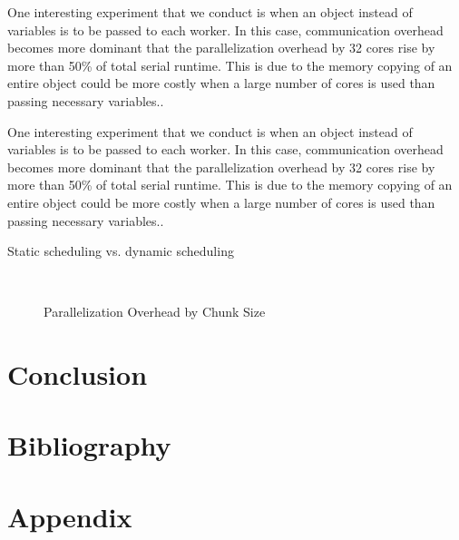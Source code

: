 \documentclass[12pt]{article}
\begin{document}
One interesting experiment that we conduct is when an object instead of variables is to be passed to each worker. In this case, communication overhead becomes more dominant that the parallelization overhead by 32 cores rise by more than 50\% of total serial runtime. This is due to the memory copying of an entire object could be more costly when a large number of cores is used than passing necessary variables..

One interesting experiment that we conduct is when an object instead of variables is to be passed to each worker. In this case, communication overhead becomes more dominant that the parallelization overhead by 32 cores rise by more than 50\% of total serial runtime. This is due to the memory copying of an entire object could be more costly when a large number of cores is used than passing necessary variables..

Static scheduling vs. dynamic scheduling


\begin{figure}[h!]\label{fig:po_chunk}
\sf
\begin{center}
\caption{\sf Parallelization Overhead by Chunk Size}
\\
\end{center}
\end{figure}


\section{Conclusion}



\clearpage
\section{Bibliography}
%





\clearpage
\section{Appendix}
\end{document}
